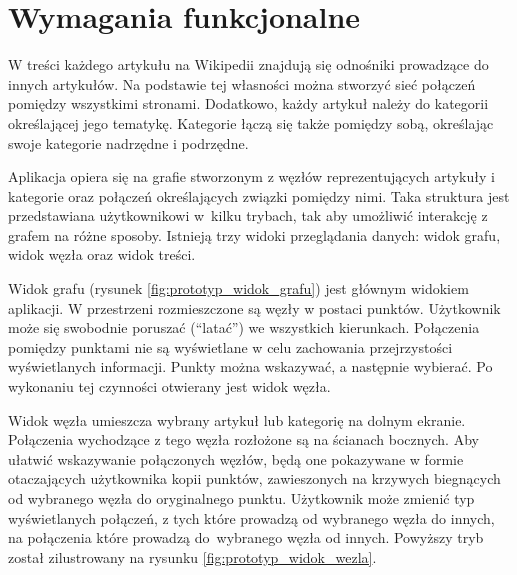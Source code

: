 \section{Wymagania funkcjonalne}
\label{sec:wymagania-funkcjonalne}

W treści każdego artykułu na Wikipedii znajdują się odnośniki prowadzące do innych artykułów. Na podstawie tej własności można stworzyć sieć połączeń pomiędzy wszystkimi stronami. Dodatkowo, każdy artykuł należy do kategorii określającej jego tematykę. Kategorie łączą się także pomiędzy sobą, określając swoje kategorie nadrzędne i podrzędne.

Aplikacja opiera się na grafie stworzonym z węzłów reprezentujących artykuły i kategorie oraz połączeń określających związki pomiędzy nimi. Taka struktura jest przedstawiana użytkownikowi w~kilku trybach, tak aby umożliwić interakcję z grafem na różne sposoby. Istnieją trzy widoki przeglądania danych: widok grafu, widok węzła oraz widok treści.

Widok grafu (rysunek \ref{fig:prototyp_widok_grafu}) jest głównym widokiem aplikacji. W przestrzeni rozmieszczone są węzły w postaci punktów. Użytkownik może się swobodnie poruszać (``latać'') we wszystkich kierunkach. Połączenia pomiędzy punktami nie są wyświetlane w celu zachowania przejrzystości wyświetlanych informacji. Punkty można wskazywać, a następnie wybierać. Po wykonaniu tej czynności otwierany jest widok węzła.


Widok węzła umieszcza wybrany artykuł lub kategorię na dolnym ekranie. Połączenia wychodzące z tego węzła rozłożone są na ścianach bocznych. Aby ułatwić wskazywanie połączonych węzłów, będą one pokazywane w formie otaczających użytkownika kopii punktów, zawieszonych na krzywych biegnących od wybranego węzła do oryginalnego punktu. Użytkownik może zmienić typ wyświetlanych połączeń, z tych które prowadzą od wybranego węzła do innych, na połączenia które prowadzą do~wybranego węzła od innych. Powyższy tryb został zilustrowany na rysunku \ref{fig:prototyp_widok_wezla}.

